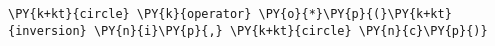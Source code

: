 \begin{Verbatim}[commandchars=\\\{\}]
    \PY{k+kt}{circle} \PY{k}{operator} \PY{o}{*}\PY{p}{(}\PY{k+kt}{inversion} \PY{n}{i}\PY{p}{,} \PY{k+kt}{circle} \PY{n}{c}\PY{p}{)}
\end{Verbatim}
